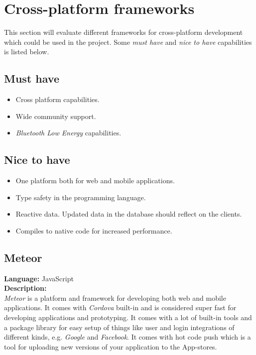 \section{Cross-platform frameworks}

This section will evaluate different frameworks for cross-platform development which could be used in the project. 
Some \textit{must have} and \textit{nice to have} capabilities is listed below.
	
\subsection*{Must have}
	\begin{itemize}
	\item Cross platform capabilities.
	\item Wide community support.
	\item \textit{Bluetooth Low Energy} capabilities.
	\end{itemize}
	
\subsection*{Nice to have}
	
	\begin{itemize}
	\item One platform both for web and mobile applications.
	\item Type safety in the programming language.
	\item Reactive data. Updated data in the database should reflect on the clients.
	\item Compiles to native code for increased performance.
	\end{itemize}
	

\subsection*{Meteor}
\textbf{Language:} JavaScript
\\
\textbf{Description:}
\\
\textit{Meteor} is a platform and framework for developing both web and mobile applications. 
It comes with \textit{Cordova} built-in and is considered super fast for developing applications and prototyping. 
It comes with a lot of built-in tools and a package library for easy setup of things like user  and login integrations of different kinds, e.g. \textit{Google} and \textit{Facebook}. It comes with hot code push which is a tool for uploading new versions of your application to the App-stores.

